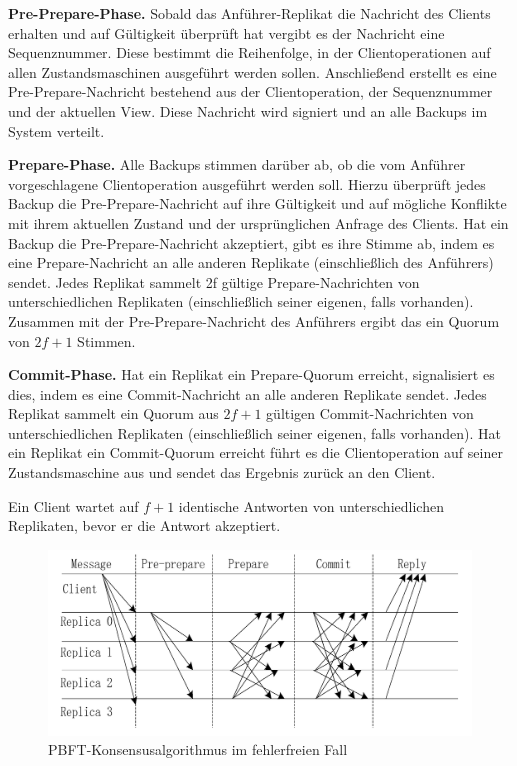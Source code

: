 \documentclass[nonacm,sigconf,natbib=false]{acmart}
\begin{document}
\textbf{Pre-Prepare-Phase.} Sobald das Anführer-Replikat die Nachricht des Clients erhalten und auf Gültigkeit überprüft hat vergibt es der Nachricht eine Sequenznummer. Diese bestimmt die Reihenfolge, in der Clientoperationen auf allen Zustandsmaschinen ausgeführt werden sollen. Anschließend erstellt es eine Pre-Prepare-Nachricht bestehend aus der Clientoperation, der Sequenznummer und der aktuellen View. Diese Nachricht wird signiert und an alle Backups im System verteilt.

\textbf{Prepare-Phase.} Alle Backups stimmen darüber ab, ob die vom Anführer vorgeschlagene Clientoperation ausgeführt werden soll. Hierzu überprüft jedes Backup die Pre-Prepare-Nachricht auf ihre Gültigkeit und auf mögliche Konflikte mit ihrem aktuellen Zustand und der ursprünglichen Anfrage des Clients. Hat ein Backup die Pre-Prepare-Nachricht akzeptiert, gibt es ihre Stimme ab, indem es eine Prepare-Nachricht an alle anderen Replikate (einschließlich des Anführers) sendet. Jedes Replikat sammelt 2f gültige Prepare-Nachrichten von unterschiedlichen Replikaten (einschließlich seiner eigenen, falls vorhanden). Zusammen mit der Pre-Prepare-Nachricht des Anführers ergibt das ein Quorum von $2f+1$ Stimmen.

\textbf{Commit-Phase.} Hat ein Replikat ein Prepare-Quorum erreicht, signalisiert es dies, indem es eine Commit-Nachricht an alle anderen Replikate sendet. Jedes Replikat sammelt ein Quorum aus $2f+1$ gültigen Commit-Nachrichten von unterschiedlichen Replikaten (einschließlich seiner eigenen, falls vorhanden). Hat ein Replikat ein Commit-Quorum erreicht führt es die Clientoperation auf seiner Zustandsmaschine aus und sendet das Ergebnis zurück an den Client.

Ein Client wartet auf $f+1$ identische Antworten von unterschiedlichen Replikaten, bevor er die Antwort akzeptiert.

\begin{figure}[htbp]
  \centering
  \includegraphics[width=\linewidth]{pbft-normal.png}
  \caption{PBFT-Konsensusalgorithmus im fehlerfreien Fall}
  \label{fig:pbft-normal}
\end{figure}
\end{document}
